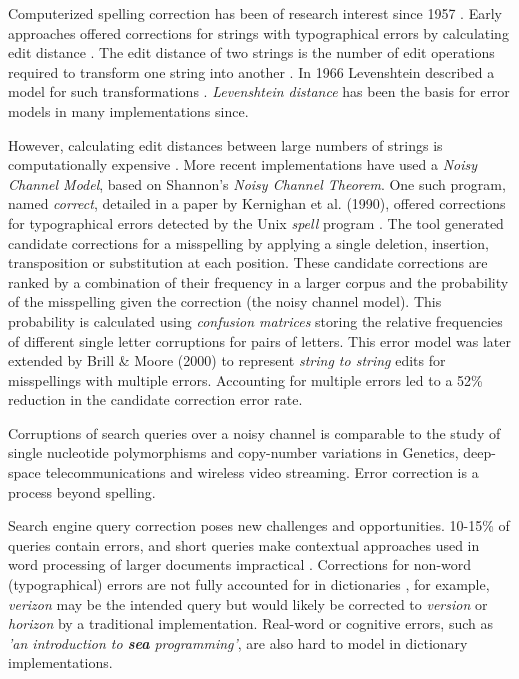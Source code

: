 \documentclass{csfourzero}
\begin{document}
Computerized spelling correction has been of research interest since 1957 \cite{jameslpeterson1980beginning}. Early approaches offered corrections for strings with typographical errors by calculating edit distance \cite{1992correctiondiscussion}. The edit distance of two strings is the number of edit operations required to transform one string into another \cite{introIR}. In 1966 Levenshtein described a model for such transformations \cite{levenshtein1966binary}. \textit{Levenshtein distance} has been the basis for error models in many implementations since.

However, calculating edit distances between large numbers of strings is computationally expensive \cite{2009adaptivespellchecker}. More recent implementations have used a \textit{Noisy Channel Model}, based on Shannon's \textit{Noisy Channel Theorem}. One such program, named \textit{correct}, detailed in a paper by Kernighan et al. (1990), offered corrections for typographical errors detected by the Unix \textit{spell} program \cite{originalnoisychannel}. The tool generated candidate corrections for a misspelling by applying a single deletion, insertion, transposition or substitution at each position. These candidate corrections are ranked by a combination of their frequency in a larger corpus and the probability of the misspelling given the correction (the noisy channel model). This probability is calculated using \textit{confusion matrices} storing the relative frequencies of different single letter corruptions for pairs of letters. This error model was later extended by Brill \& Moore (2000) \cite{betternoisychannel} to represent \textit{string to string} edits for misspellings with multiple errors. Accounting for multiple errors led to a 52\% reduction in the candidate correction error rate.

Corruptions of search queries over a noisy channel is comparable to the study of single nucleotide polymorphisms and copy-number variations in Genetics, deep-space telecommunications and wireless video streaming. Error correction is a process beyond spelling.

Search engine query correction poses new challenges and opportunities. 10-15\% of queries contain errors, and short queries make contextual approaches used in word processing of larger documents impractical \cite{webuserpoweredspelling}. Corrections for non-word (typographical) errors are not fully accounted for in dictionaries \cite{webuser3}, for example, \textit{verizon} may be the intended query but would likely be corrected to \textit{version} or \textit{horizon} by a traditional implementation. Real-word or cognitive errors, such as \textit{'an introduction to \textbf{sea} programming'}, are also hard to model in dictionary implementations.
\end{document}
